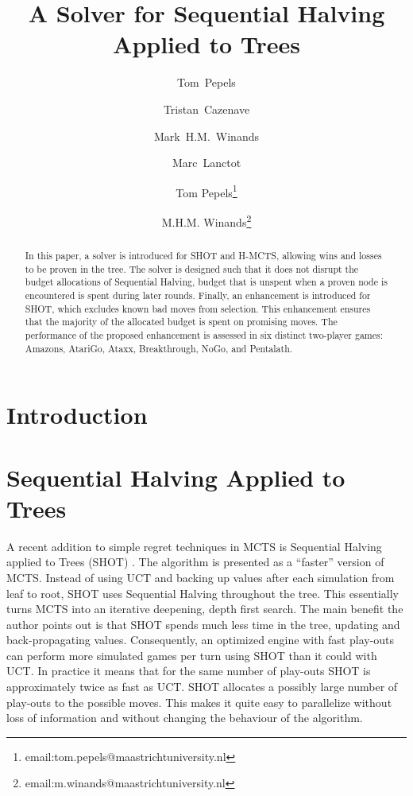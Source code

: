 \documentclass{icga}
\title{A Solver for Sequential Halving Applied to Trees}
\author{Tom~Pepels\inst{1} \and Tristan~Cazenave\inst{2} \and
Mark~H.M.~Winands\inst{1} \and Marc~Lanctot\inst{1}}
\institute{Department of Knowledge Engineering,  Maastricht University\\ \email{\{tom.pepels,m.winands,marc.lanctot\}@maastrichtuniversity.nl} \and LAMSADE - Université Paris-Dauphine \\ \email{cazenave@lamsade.dauphine.fr}}
\author{Tom Pepels\thanks{email:tom.pepels@maastrichtuniversity.nl} \and M.H.M. Winands\thanks{email:m.winands@maastrichtuniversity.nl}}
\affiliation{Maastricht University, Maastricht, The
Netherlands} \issue{?, ?}
\begin{document}
\maketitle
\begin{abstract}
In this paper, a solver is introduced for SHOT and H-MCTS, allowing wins and losses to be proven in the tree. The solver is designed such that it does not disrupt the budget allocations of Sequential Halving, budget that is unspent when a proven node is encountered is spent during later rounds. Finally, an enhancement is introduced for SHOT, which excludes known bad moves from selection. This enhancement ensures that the majority of the allocated budget is spent on promising moves. The performance of the proposed enhancement is assessed in six distinct two-player games: Amazons, AtariGo, Ataxx, Breakthrough, NoGo, and Pentalath.
\end{abstract}

\section{Introduction}

\section{Sequential Halving Applied to Trees}
\label{sec:SHOT}

A recent addition to simple regret techniques in MCTS is Sequential Halving applied to Trees (SHOT) . The algorithm is presented as a ``faster'' version of MCTS. Instead of using UCT and backing up values after each simulation from leaf to root, SHOT uses Sequential Halving throughout the tree. This essentially turns MCTS into an iterative deepening, depth first search. The main benefit the author points out is that SHOT spends much less time in the tree, updating and back-propagating values. Consequently, an optimized engine with fast play-outs can perform more simulated games per turn using SHOT than it could with UCT. In practice it means that for the same number of play-outs SHOT is approximately twice as fast as UCT. SHOT allocates a
possibly large number of play-outs to the possible moves. This makes it quite easy to parallelize without loss of information and without changing the behaviour of the algorithm.
\end{document}
